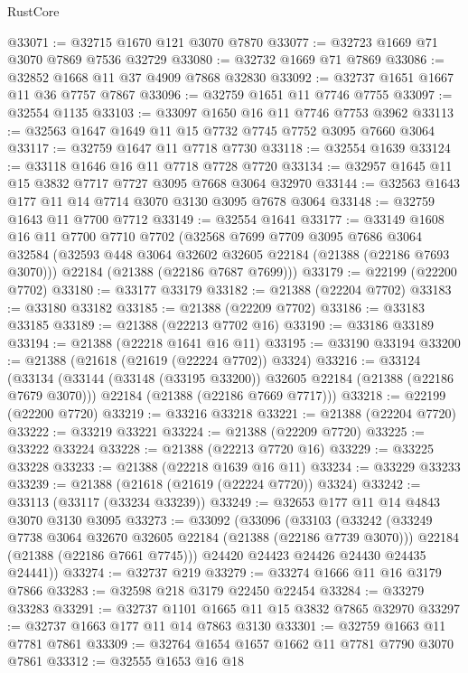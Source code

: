 \begin{lexlean}{RustCore}
\begin{coremodule}
@33071 := @32715 @1670 @121 @3070 @7870
@33077 := @32723 @1669 @71 @3070 @7869 @7536 @32729
@33080 := @32732 @1669 @71 @7869
@33086 := @32852 @1668 @11 @37 @4909 @7868 @32830
@33092 := @32737 @1651 @1667 @11 @36 @7757 @7867
@33096 := @32759 @1651 @11 @7746 @7755
@33097 := @32554 @1135
@33103 := @33097 @1650 @16 @11 @7746 @7753 @3962
@33113 := @32563 @1647 @1649 @11 @15 @7732 @7745 @7752 @3095 @7660 @3064
@33117 := @32759 @1647 @11 @7718 @7730
@33118 := @32554 @1639
@33124 := @33118 @1646 @16 @11 @7718 @7728 @7720
@33134 := @32957 @1645 @11 @15 @3832 @7717 @7727 @3095 @7668 @3064 @32970
@33144 := @32563 @1643 @177 @11 @14 @7714 @3070 @3130 @3095 @7678 @3064
@33148 := @32759 @1643 @11 @7700 @7712
@33149 := @32554 @1641
@33177 := @33149
    @1608
    @16
    @11
    @7700
    @7710
    @7702
    (@32568
      @7699
      @7709
      @3095
      @7686
      @3064
      @32584
      (@32593 @448 @3064 @32602 @32605 @22184 (@21388 (@22186 @7693 @3070)))
      @22184
      (@21388 (@22186 @7687 @7699)))
@33179 := @22199 (@22200 @7702)
@33180 := @33177 @33179
@33182 := @21388 (@22204 @7702)
@33183 := @33180 @33182
@33185 := @21388 (@22209 @7702)
@33186 := @33183 @33185
@33189 := @21388 (@22213 @7702 @16)
@33190 := @33186 @33189
@33194 := @21388 (@22218 @1641 @16 @11)
@33195 := @33190 @33194
@33200 := @21388 (@21618 (@21619 (@22224 @7702)) @3324)
@33216 := @33124
    (@33134
      (@33144 (@33148 (@33195 @33200)) @32605 @22184 (@21388 (@22186 @7679 @3070)))
      @22184
      (@21388 (@22186 @7669 @7717)))
@33218 := @22199 (@22200 @7720)
@33219 := @33216 @33218
@33221 := @21388 (@22204 @7720)
@33222 := @33219 @33221
@33224 := @21388 (@22209 @7720)
@33225 := @33222 @33224
@33228 := @21388 (@22213 @7720 @16)
@33229 := @33225 @33228
@33233 := @21388 (@22218 @1639 @16 @11)
@33234 := @33229 @33233
@33239 := @21388 (@21618 (@21619 (@22224 @7720)) @3324)
@33242 := @33113 (@33117 (@33234 @33239))
@33249 := @32653 @177 @11 @14 @4843 @3070 @3130 @3095
@33273 := @33092
    (@33096
      (@33103
        (@33242
          (@33249 @7738 @3064 @32670 @32605 @22184 (@21388 (@22186 @7739 @3070)))
          @22184
          (@21388 (@22186 @7661 @7745)))
        @24420
        @24423
        @24426
        @24430
        @24435
        @24441))
@33274 := @32737 @219
@33279 := @33274 @1666 @11 @16 @3179 @7866
@33283 := @32598 @218 @3179 @22450 @22454
@33284 := @33279 @33283
@33291 := @32737 @1101 @1665 @11 @15 @3832 @7865 @32970
@33297 := @32737 @1663 @177 @11 @14 @7863 @3130
@33301 := @32759 @1663 @11 @7781 @7861
@33309 := @32764 @1654 @1657 @1662 @11 @7781 @7790 @3070 @7861
@33312 := @32555 @1653 @16 @18

\end{coremodule}
\end{lexlean}
